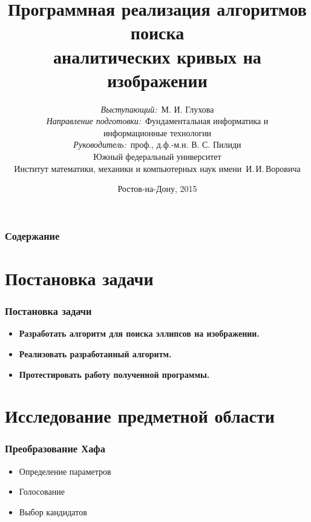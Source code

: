 \documentclass[14pt]{beamer}
\title{\small{Программная реализация алгоритмов поиска \\аналитических кривых на изображении}}
\author{\small{%
\emph{Выступающий:}~М. И. Глухова\\%
\emph{Направление подготовки:}~Фундаментальная информатика и \\информационные технологии\\%
\emph{Руководитель:}~проф., д.ф.-м.н. В. С. Пилиди}\\%
\vspace{15pt}%
    Южный федеральный университет\\
	Институт математики, механики и компьютерных наук
    имени~И.\,И.\,Воровича%
}
\date{\small{Ростов-на-Дону, 2015}}
\begin{document}
\maketitle

\begin{frame}
\frametitle{Содержание} %
\tableofcontents %
\end{frame}


\section{Постановка задачи}
\begin{frame}
\frametitle{Постановка задачи}
\begin{itemize}
  \item \textbf{Разработать алгоритм для поиска эллипсов на изображении.} 
  \item \textbf{Реализовать разработанный алгоритм.} 
  \item \textbf{Протестировать работу полученной программы.} 
\end{itemize}
\end{frame}

\section{Исследование предметной области}
\begin{frame}
\frametitle{Преобразование Хафа}
\begin{itemize}
  \item Определение параметров
  \item Голосование
  \item Выбор кандидатов   
\end{itemize}
\end{frame}
\end{document}
